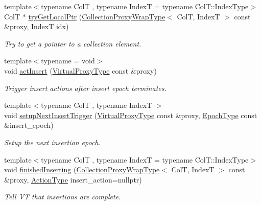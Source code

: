 \begin{DoxyCompactItemize}
{\footnotesize template$<$typename ColT , typename IndexT  = typename Col\+T\+::\+Index\+Type$>$ }\\ColT $\ast$ \hyperlink{structvt_1_1vrt_1_1collection_1_1_collection_manager_a09bd0e2b03bd5f638bdc44f7ffeef715}{try\+Get\+Local\+Ptr} (\hyperlink{structvt_1_1vrt_1_1collection_1_1_collection_manager_a56458ed7f9bb22b631b9b3a745f42f94}{Collection\+Proxy\+Wrap\+Type}$<$ ColT, IndexT $>$ const \&proxy, IndexT idx)
\begin{DoxyCompactList}\small\item\em Try to get a pointer to a collection element. \end{DoxyCompactList}\item 
{\footnotesize template$<$typename  = void$>$ }\\void \hyperlink{structvt_1_1vrt_1_1collection_1_1_collection_manager_aba521bf30580ffe5a815b5e50bfbcbfe}{act\+Insert} (\hyperlink{namespacevt_a1b417dd5d684f045bb58a0ede70045ac}{Virtual\+Proxy\+Type} const \&proxy)
\begin{DoxyCompactList}\small\item\em Trigger insert actions after insert epoch terminates. \end{DoxyCompactList}\item 
{\footnotesize template$<$typename ColT , typename IndexT $>$ }\\void \hyperlink{structvt_1_1vrt_1_1collection_1_1_collection_manager_a1d93ed0d843deb241d788c305033b9e0}{setup\+Next\+Insert\+Trigger} (\hyperlink{namespacevt_a1b417dd5d684f045bb58a0ede70045ac}{Virtual\+Proxy\+Type} const \&proxy, \hyperlink{namespacevt_a985a5adf291c34a3ca263b3378388236}{Epoch\+Type} const \&insert\+\_\+epoch)
\begin{DoxyCompactList}\small\item\em Setup the next insertion epoch. \end{DoxyCompactList}\item 
{\footnotesize template$<$typename ColT , typename IndexT  = typename Col\+T\+::\+Index\+Type$>$ }\\void \hyperlink{structvt_1_1vrt_1_1collection_1_1_collection_manager_a54edc9079585574858ecf512761f8efc}{finished\+Inserting} (\hyperlink{structvt_1_1vrt_1_1collection_1_1_collection_manager_a56458ed7f9bb22b631b9b3a745f42f94}{Collection\+Proxy\+Wrap\+Type}$<$ ColT, IndexT $>$ const \&proxy, \hyperlink{namespacevt_ae0a5a7b18cc99d7b732cb4d44f46b0f3}{Action\+Type} insert\+\_\+action=nullptr)
\begin{DoxyCompactList}\small\item\em Tell VT that insertions are complete. \end{DoxyCompactList}\item 

\end{DoxyCompactItemize}
